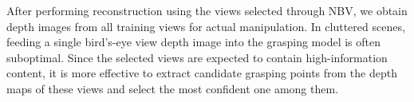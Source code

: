 
After performing reconstruction using the views selected through NBV, we obtain depth images from all training views for actual manipulation. In cluttered scenes, feeding a single bird’s-eye view depth image into the grasping model is often suboptimal. Since the selected views are expected to contain high-information content, it is more effective to extract candidate grasping points from the depth maps of these views and select the most confident one among them.

